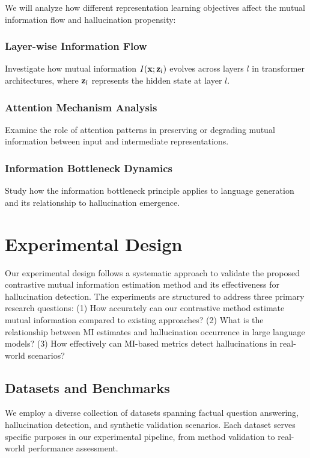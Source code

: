 We will analyze how different representation learning objectives affect the mutual information flow and hallucination propensity:

\subsubsection{Layer-wise Information Flow}
Investigate how mutual information $I({\mathbf{x}}; {\mathbf{z}}_l)$ evolves across layers $l$ in transformer architectures, where ${\mathbf{z}}_l$ represents the hidden state at layer $l$.

\subsubsection{Attention Mechanism Analysis}
Examine the role of attention patterns in preserving or degrading mutual information between input and intermediate representations.

\subsubsection{Information Bottleneck Dynamics}
Study how the information bottleneck principle applies to language generation and its relationship to hallucination emergence.

\section{Experimental Design}
\label{sec:experiments}

Our experimental design follows a systematic approach to validate the proposed contrastive mutual information estimation method and its effectiveness for hallucination detection. The experiments are structured to address three primary research questions: (1) How accurately can our contrastive method estimate mutual information compared to existing approaches? (2) What is the relationship between MI estimates and hallucination occurrence in large language models? (3) How effectively can MI-based metrics detect hallucinations in real-world scenarios?

\subsection{Datasets and Benchmarks}
\label{subsec:datasets}

We employ a diverse collection of datasets spanning factual question answering, hallucination detection, and synthetic validation scenarios. Each dataset serves specific purposes in our experimental pipeline, from method validation to real-world performance assessment.

